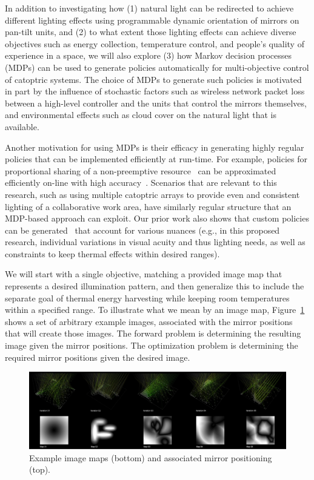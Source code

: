 In addition to investigating how (1) natural light can be redirected to achieve
different lighting effects using programmable dynamic orientation of mirrors on 
pan-tilt units, and (2) to what extent those lighting effects can achieve diverse
objectives such as energy collection, temperature control, and people's quality 
of experience in a space, we will also explore (3) how Markov decision processes 
(MDPs) can be used to generate policies automatically for multi-objective control of 
catoptric systems.  The choice of MDPs to generate such policies is motivated in part 
by the influence of stochastic factors such as wireless network packet loss between
a high-level controller and the units that control the mirrors themselves, and 
environmental effects such as cloud cover on the natural light that is available.

Another motivation for using MDPs is their efficacy in generating highly regular 
policies that can be implemented efficiently at run-time.  For example, policies for
proportional sharing of a non-preemptive resource~\cite{gtgs09,gtsg08} can be 
approximated efficiently on-line with high accuracy~\cite{gtspmgs10}.  Scenarios
that are relevant to this research, such as using multiple catoptric arrays to
provide even and consistent lighting of a collaborative work area, have similarly
regular structure that an MDP-based approach can exploit.  Our prior work also
shows that custom policies can be generated~\cite{tblwgs11,tggs10} that account for various 
nuances (e.g., in this proposed research, individual variations in visual acuity and thus 
lighting needs, as well as constraints to keep thermal effects within desired ranges).

We will start with a single objective, matching a provided image map that represents a 
desired illumination pattern, and then generalize this to include the separate goal of 
thermal energy harvesting while keeping room temperatures within a specified range.
To illustrate what we mean by an image map, Figure~\ref{fig:maps}
shows a set of arbitrary example images, associated with the mirror
positions that will create those images.  The forward problem is determining
the resulting image given the mirror positions.  The optimization problem
is determining the required mirror positions given the desired image.

\begin{figure}[ht]
\centering
\includegraphics[width=0.9\linewidth]{figures/maps}
\caption{Example image maps (bottom) and associated mirror positioning (top).}
\label{fig:maps}
\end{figure}

